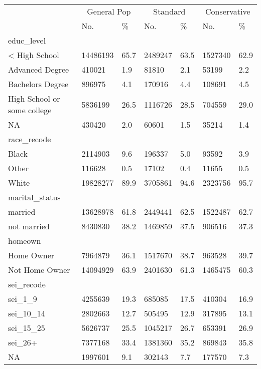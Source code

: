 \captionsetup[table]{labelformat=empty,skip=1pt}
\begin{longtable}{lllllll}
\toprule
 & \multicolumn{2}{c}{General Pop} & \multicolumn{2}{c}{Standard} & \multicolumn{2}{c}{Conservative} \\ 
 \cmidrule(lr){2-3} \cmidrule(lr){4-5} \cmidrule(lr){6-7}
 & No. & \% & No. & \% & No. & \% \\ 
\midrule
\multicolumn{1}{l}{educ\_level} \\ 
\midrule
< High School & 14486193 & 65.7 & 2489247 & 63.5 & 1527340 & 62.9 \\ 
Advanced Degree & 410021 & 1.9 & 81810 & 2.1 & 53199 & 2.2 \\ 
Bachelors Degree & 896975 & 4.1 & 170916 & 4.4 & 108691 & 4.5 \\ 
High School or some college & 5836199 & 26.5 & 1116726 & 28.5 & 704559 & 29.0 \\ 
NA & 430420 & 2.0 & 60601 & 1.5 & 35214 & 1.4 \\ 
\midrule
\multicolumn{1}{l}{race\_recode} \\ 
\midrule
Black & 2114903 & 9.6 & 196337 & 5.0 & 93592 & 3.9 \\ 
Other & 116628 & 0.5 & 17102 & 0.4 & 11655 & 0.5 \\ 
White & 19828277 & 89.9 & 3705861 & 94.6 & 2323756 & 95.7 \\ 
\midrule
\multicolumn{1}{l}{marital\_status} \\ 
\midrule
married & 13628978 & 61.8 & 2449441 & 62.5 & 1522487 & 62.7 \\ 
not married & 8430830 & 38.2 & 1469859 & 37.5 & 906516 & 37.3 \\ 
\midrule
\multicolumn{1}{l}{homeown} \\ 
\midrule
Home Owner & 7964879 & 36.1 & 1517670 & 38.7 & 963528 & 39.7 \\ 
Not Home Owner & 14094929 & 63.9 & 2401630 & 61.3 & 1465475 & 60.3 \\ 
\midrule
\multicolumn{1}{l}{sei\_recode} \\ 
\midrule
sei\_1\_9 & 4255639 & 19.3 & 685085 & 17.5 & 410304 & 16.9 \\ 
sei\_10\_14 & 2802663 & 12.7 & 505495 & 12.9 & 317895 & 13.1 \\ 
sei\_15\_25 & 5626737 & 25.5 & 1045217 & 26.7 & 653391 & 26.9 \\ 
sei\_26+ & 7377168 & 33.4 & 1381360 & 35.2 & 869843 & 35.8 \\ 
NA & 1997601 & 9.1 & 302143 & 7.7 & 177570 & 7.3 \\ 

\end{longtable}
